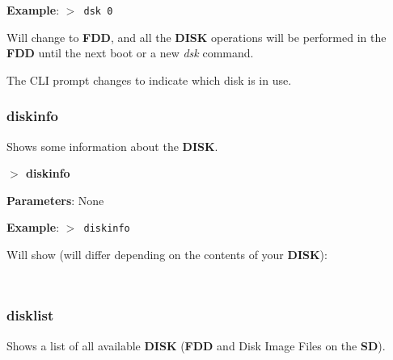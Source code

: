         \textbf{Example}: \texttt{$>$ dsk 0}

        Will change to \textbf{FDD}, and all the \textbf{DISK} operations will
        be performed in the \textbf{FDD} until the next boot or a new \textit{dsk}
        command.

        The CLI prompt changes to indicate which disk is in use.

        \subsubsection{{diskinfo}}
        Shows some information about the \textbf{DISK}.

        \hspace{1.9cm}\textbf{$>$ diskinfo}

        \textbf{Parameters}: None

        \textbf{Example}: \texttt{$>$ diskinfo}

        Will show (will differ depending on the contents of your \textbf{DISK}):

        \texttt{
        }

        \subsubsection{{disklist}}
        Shows a list of all available \textbf{DISK} (\textbf{FDD} and Disk Image
        Files on the \textbf{SD}).

